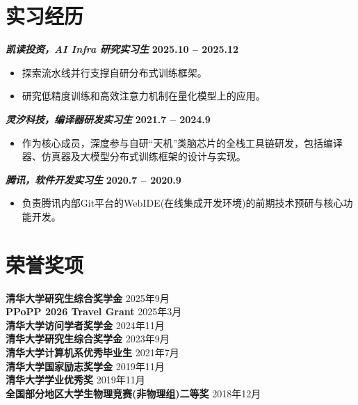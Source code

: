 \documentclass{resume}
\newenvironment{compactproject}[2]{
    \vspace{3pt} %
    \noindent\textbf{\textit{#1}} %
    \hfill
    \textbf{#2} %
    \par\vspace{2pt} %
    \begin{itemize}[leftmargin=1.2em, topsep=1pt, partopsep=0pt, itemsep=0pt, parsep=1pt]
}{
    \end{itemize}
}
\begin{document}
\section{实习经历}
\begin{compactproject}
{凯读投资，AI Infra 研究实习生 }{2025.10 -- 2025.12}
\item 探索流水线并行支撑自研分布式训练框架。
\item 研究低精度训练和高效注意力机制在量化模型上的应用。
\end{compactproject}

\begin{compactproject}
{灵汐科技，编译器研发实习生 }{2021.7 -- 2024.9}
\item 作为核心成员，深度参与自研“天机”类脑芯片的全栈工具链研发，包括编译器、仿真器及大模型分布式训练框架的设计与实现。
\end{compactproject}

\begin{compactproject}
{腾讯，软件开发实习生}{2020.7 -- 2020.9}
\item 负责腾讯内部Git平台的WebIDE(在线集成开发环境)的前期技术预研与核心功能开发。
\end{compactproject}

\section{荣誉奖项}
\textbf{清华大学研究生综合奖学金} \hfill 2025年9月 \\
\textbf{PPoPP 2026 Travel Grant} \hfill 2025年3月 \\
\textbf{清华大学访问学者奖学金} \hfill 2024年11月 \\
\textbf{清华大学研究生综合奖学金} \hfill 2023年9月 \\
\textbf{清华大学计算机系优秀毕业生} \hfill 2021年7月 \\
\textbf{清华大学国家励志奖学金} \hfill 2019年11月 \\
\textbf{清华大学学业优秀奖} \hfill 2019年11月 \\
\textbf{全国部分地区大学生物理竞赛(非物理组)二等奖} \hfill 2018年12月 \\
\end{document}
